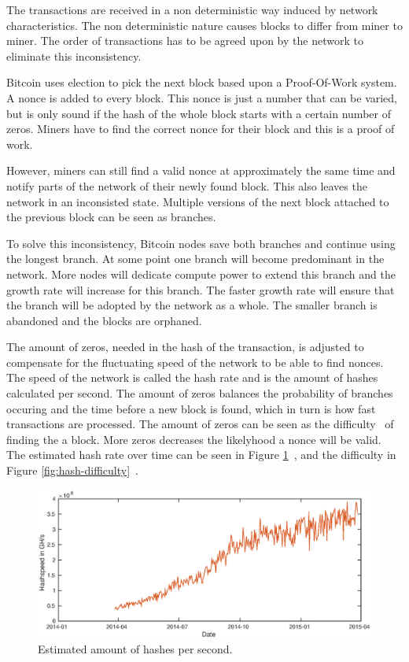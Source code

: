 The transactions are received in a non deterministic way induced by network characteristics.
The non deterministic nature causes blocks to differ from miner to miner.
The order of transactions has to be agreed upon by the network to eliminate this inconsistency.

Bitcoin uses election to pick the next block based upon a Proof-Of-Work system.
A nonce is added to every block.
This nonce is just a number that can be varied,
but is only sound if the hash of the whole block starts with a certain number of zeros.
Miners have to find the correct nonce for their block and this is a proof of work.

However, miners can still find a valid nonce at approximately the same time
and notify parts of the network of their newly found block.
This also leaves the network in an inconsisted state.
Multiple versions of the next block attached to the previous block can be seen as branches.

To solve this inconsistency, Bitcoin nodes save both branches and continue using the longest branch.
At some point one branch will become predominant in the network.
More nodes will dedicate compute power to extend this branch and the growth rate will increase for this branch.
The faster growth rate will ensure that the branch will be adopted by the network as a whole.
The smaller branch is abandoned and the blocks are orphaned.

The amount of zeros, needed in the hash of the transaction,
is adjusted to compensate for the fluctuating speed of the network to be able to find nonces.
The speed of the network is called the hash rate and is the amount of hashes calculated per second.
The amount of zeros balances the probability of branches occuring
and the time before a new block is found,
which in turn is how fast transactions are processed.
The amount of zeros can be seen as the difficulty~\cite{bitcoin-difficulty} of finding the a block.
More zeros decreases the likelyhood a nonce will be valid.
The estimated hash rate over time can be seen in Figure \ref{fig:hash-speed}~\cite{Blockchain.info-hashspeed},
and the difficulty in Figure \ref{fig:hash-difficulty}~\cite{Blockchain.info-difficulty}.

\begin{figure}[h]
        \centerline{\includegraphics[scale=0.5]{relatedWork/figs/hashspeed/hashspeed.eps}}
        \caption{Estimated amount of hashes per second.}
	\label{fig:hash-speed}
\end{figure}

